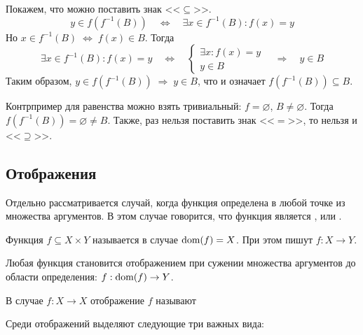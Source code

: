 \begin{Answer}
    \noindent
    Покажем, что можно поставить знак <<$ \subseteq $>>.
    \[
        y \in f(f^{-1}(B)) \quad \Longleftrightarrow \quad \exists x \in f^{-1}(B): f(x) = y
    \]
    Но $ x \in f^{-1}(B) \; \Longleftrightarrow \; f(x) \in B $.
    Тогда
    \[
        \exists x \in f^{-1}(B): f(x) = y
        \quad \Longleftrightarrow \quad
        \begin{cases}
            \exists x: f(x) = y \\
            y \in B
        \end{cases}
        \quad \Longrightarrow \quad
        y \in B
    \]
    Таким образом, $ y \in f(f^{-1}(B)) \; \Longrightarrow \; y \in B $,
    что и означает $ f(f^{-1}(B)) \subseteq B $.

    Контрпример для равенства можно взять тривиальный: $ f = \varnothing $, $ B \neq \varnothing $.
    Тогда $ f(f^{-1}(B)) = \varnothing \neq B $.
    Также, раз нельзя поставить знак <<$ = $>>,
    то нельзя и <<$ \supseteq $>>.
\end{Answer}

\subsection{Отображения}
\label{subsec:functions:mappings}

Отдельно рассматривается случай, когда функция определена в любой точке из множества аргументов.
В этом случае говорится, что функция является , или .

\begin{definition}
    Функция $ f \subseteq X \times Y $ называется  в случае $ \operatorname*{\textnormal{dom}}(f) = X $.
    При этом пишут $ f: X \to Y $.
\end{definition}

\begin{remark}
    Любая функция становится отображением при сужении множества аргументов до области определения: $ f: \operatorname*{\textnormal{dom}}(f) \to Y $.
\end{remark}

\begin{definition}
    В случае $ f: X \to X $ отображение $ f $ называют 
\end{definition}

Среди отображений выделяют следующие три важных вида:

